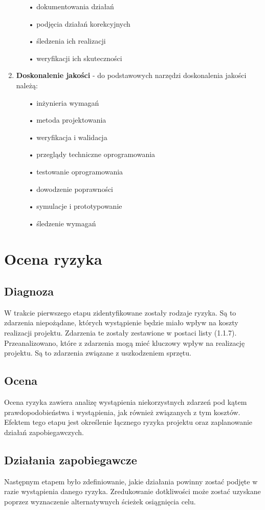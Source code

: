 \begin{enumerate}
\begin{itemize}
\item[•] dokumentowania działań
\item[•] podjęcia działań korekcyjnych
\item[•] śledzenia ich realizacji
\item[•] weryfikacji ich skuteczności
\end{itemize}
\item \textbf{Doskonalenie jakości} - do podstawowych narzędzi doskonalenia jakości należą:
\begin{itemize}
\item[•] inżynieria wymagań
\item[•] metoda projektowania
\item[•] weryfikacja i walidacja
\item[•] przeglądy techniczne oprogramowania
\item[•] testowanie oprogramowania
\item[•] dowodzenie poprawności
\item[•] symulacje i prototypowanie
\item[•] śledzenie wymagań
\end{itemize}
\end{enumerate}
\section{Ocena ryzyka}
\subsection{Diagnoza}
W trakcie pierwszego etapu zidentyfikowane zostały rodzaje ryzyka. Są to zdarzenia niepożądane, których wystąpienie będzie miało wpływ na koszty realizacji projektu. Zdarzenia te zostały zestawione w postaci listy (1.1.7). Przeanalizowano, które z zdarzenia mogą mieć kluczowy wpływ na realizację projektu. Są to zdarzenia związane z uszkodzeniem sprzętu.
\subsection{Ocena}
Ocena ryzyka zawiera analizę wystąpienia niekorzystnych zdarzeń pod kątem prawdopodobieństwa i wystąpienia, jak również związanych z tym kosztów. Efektem tego etapu jest określenie łącznego ryzyka projektu oraz zaplanowanie działań zapobiegawczych.
\subsection{Działania zapobiegawcze}
Następnym etapem było zdefiniowanie, jakie działania powinny zostać podjęte w razie wystąpienia danego ryzyka. Zredukowanie dotkliwości może zostać uzyskane poprzez wyznaczenie alternatywnych ścieżek osiągnięcia celu. 
